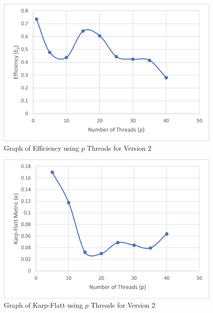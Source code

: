 \begin{figure}[H]
    \centering
    \includegraphics{Ep2}
    \caption{Graph of Efficiency using $p$ Threads for Version 2}
    \label{fig:Ep2}
\end{figure}

\begin{figure}[H]
    \centering
    \includegraphics{kf2}
    \caption{Graph of Karp-Flatt using $p$ Threads for Version 2}
    \label{fig:kf2}
\end{figure}